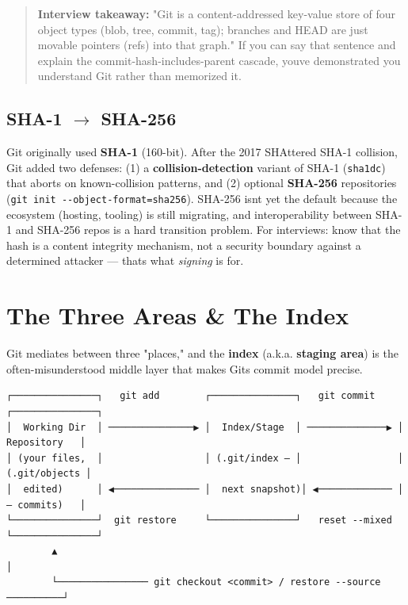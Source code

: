 \documentclass[11pt]{article}
\begin{document}
\begin{quote}
\textbf{Interview takeaway:} "Git is a content-addressed key-value store of four object types (blob, tree, commit, tag); branches and HEAD are just movable pointers (refs) into that graph." If you can say that sentence and explain the commit-hash-includes-parent cascade, you\textquotesingle ve demonstrated you understand Git rather than memorized it.
\end{quote}

\subsection{\texorpdfstring{SHA-1 \(\rightarrow\) SHA-256}{SHA-1 \textbackslash rightarrow SHA-256}}\label{sha-1-rightarrow-sha-256}

Git originally used \textbf{SHA-1} (160-bit). After the 2017 SHAttered SHA-1 collision, Git added two defenses: (1) a \textbf{collision-detection} variant of SHA-1 (\texttt{sha1dc}) that aborts on known-collision patterns, and (2) optional \textbf{SHA-256} repositories (\texttt{git\ init\ -\/-object-format=sha256}). SHA-256 isn\textquotesingle t yet the default because the ecosystem (hosting, tooling) is still migrating, and interoperability between SHA-1 and SHA-256 repos is a hard transition problem. For interviews: know that the hash is a content integrity mechanism, not a security boundary against a determined attacker --- that\textquotesingle s what \emph{signing} is for.

\section{The Three Areas \& The Index}\label{the-three-areas--the-index}

Git mediates between three "places," and the \textbf{index} (a.k.a. \textbf{staging area}) is the often-misunderstood middle layer that makes Git\textquotesingle s commit model precise.

\setcodelang{}

\begin{verbatim}
┌───────────────┐   git add        ┌───────────────┐   git commit    ┌───────────────┐
│  Working Dir  │ ───────────────▶ │  Index/Stage  │ ──────────────▶ │  Repository   │
│ (your files,  │                  │ (.git/index — │                 │ (.git/objects │
│  edited)      │ ◀─────────────── │  next snapshot)│ ◀───────────── │  — commits)   │
└───────────────┘  git restore     └───────────────┘   reset --mixed └───────────────┘
        ▲                                                                     │
        └──────────────── git checkout <commit> / restore --source ──────────┘
\end{verbatim}
\end{document}

